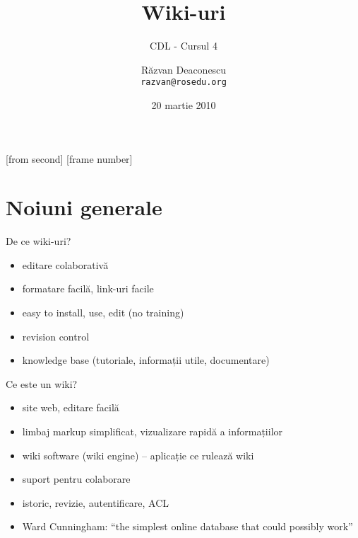 \documentclass{beamer}
\title[Wiki-uri]{Wiki-uri}
\subtitle{CDL - Cursul 4}
\institute[ROSEdu]{ROSEdu}
\date{20 martie 2010}
\author{Răzvan Deaconescu \\ \texttt{razvan@rosedu.org}}
\begin{document}
[from second]
[frame number]

\frame{\titlepage}

\frame{\tableofcontents}


\section{Noiuni generale}

\frame{\tableofcontents[currentsection]}


\begin{frame}{De ce wiki-uri?}
  \begin{itemize}
    \pause \item editare colaborativă
    \pause \item formatare facilă, link-uri facile
    \pause \item easy to install, use, edit (no training)
    \pause \item revision control
    \pause \item knowledge base (tutoriale, informații utile, documentare)
  \end{itemize}
\end{frame}

\begin{frame}{Ce este un wiki?}
  \begin{itemize}
    \pause \item site web, editare facilă
    \pause \item limbaj markup simplificat, vizualizare rapidă a informațiilor
    \pause \item wiki software (wiki engine) -- aplicație ce rulează wiki
    \pause \item suport pentru colaborare
    \pause \item istoric, revizie, autentificare, ACL
    \pause \item Ward Cunningham: ``the simplest online database that could possibly
work''
  \end{itemize}
\end{frame}
\end{document}
